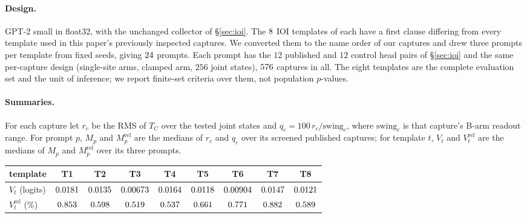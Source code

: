 \paragraph{Design.} GPT-2 small in float32, with the unchanged collector of \S\ref{sec:ioi}. The $8$ IOI templates of \citet{wang2022ioi} each have a first clause differing from every template
used in this paper's previously inspected captures. We converted them to the name order of our captures and drew
three prompts per template from fixed seeds, giving $24$ prompts. Each prompt has the $12$ published and $12$ control head pairs of
\S\ref{sec:ioi} and the same per-capture design (single-site arms, clamped arm, $256$ joint states), $576$
captures in all. The eight templates are the complete evaluation set and the unit of inference; we report finite-set
criteria over them, not population $p$-values.

\paragraph{Summaries.} For each capture let $r_c$ be the RMS of $T_C$ over the tested joint states and
$q_c=100\,r_c/\text{swing}_c$, where $\text{swing}_c$ is that capture's B-arm readout range.
For prompt $p$, $M_p$ and $M_p^{\mathrm{rel}}$ are the medians of $r_c$ and $q_c$ over its screened published captures;
for template $t$, $V_t$ and $V_t^{\mathrm{rel}}$ are the medians of $M_p$ and $M_p^{\mathrm{rel}}$ over its three prompts.

\begin{center}\small
\begin{tabular}{lcccccccc}
\toprule
template & T1 & T2 & T3 & T4 & T5 & T6 & T7 & T8 \\
\midrule
$V_t$ (logits) & $0.0181$ & $0.0135$ & $0.00673$ & $0.0164$ & $0.0118$ & $0.00904$ & $0.0147$ & $0.0121$ \\
$V_t^{\mathrm{rel}}$ (\%) & $0.853$ & $0.598$ & $0.519$ & $0.537$ & $0.661$ & $0.771$ & $0.882$ & $0.589$ \\
\bottomrule
\end{tabular}
\end{center}

